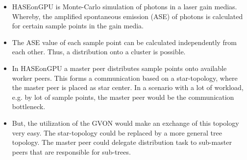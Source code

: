 \begin{itemize}
\item HASEonGPU is Monte-Carlo simulation of photons in a laser gain
  medias. Whereby, the amplified spontaneous emission (ASE) of photons
  is calculated for certain sample points in the gain media.

\item The ASE value of each sample point can be calculated
  independently from each other. Thus, a distribution onto a cluster
  is possible.

\item In HASEonGPU a master peer distributes sample points onto
  available worker peers. This forms a communication based on a
  star-topology, where the master peer is placed as star center. In a
  scenario with a lot of workload, e.g. by lot of sample points, the
  master peer would be the communication bottleneck.
  

\item But, the utilization of the GVON would make an exchange of this
  topology very easy. The star-topology could be replaced by a more
  general tree topology. The master peer could delegate distribution
  task to sub-master peers that are responsible for sub-trees.
\end{itemize}

